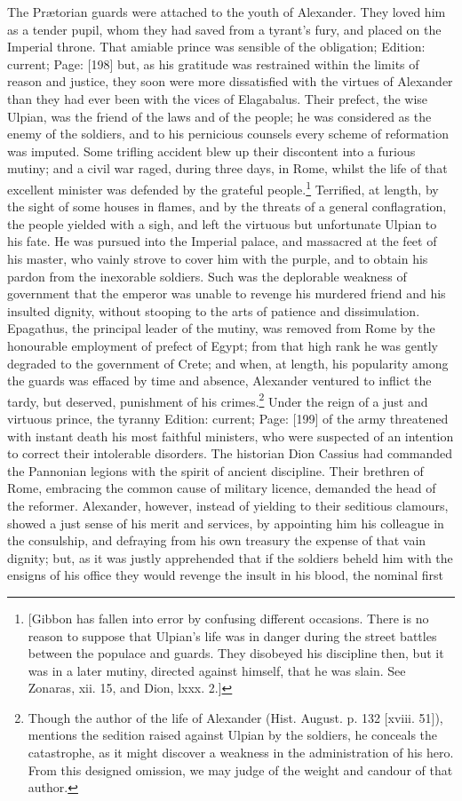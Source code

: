The Prætorian guards were attached to the youth of Alexander. They loved him as a tender pupil, whom they had saved from a tyrant\texthebrew{}’s fury, and placed on the Imperial throne. That amiable prince was sensible of the obligation; Edition: current; Page: [198] but, as his gratitude was restrained within the limits of reason and justice, they soon were more dissatisfied with the virtues of Alexander than they had ever been with the vices of Elagabalus. Their prefect, the wise Ulpian, was the friend of the laws and of the people; he was considered as the enemy of the soldiers, and to his pernicious counsels every scheme of reformation was imputed. Some trifling accident blew up their discontent into a furious mutiny; and a civil war raged, during three days, in Rome, whilst the life of that excellent minister was defended by the grateful people.\footnote{[Gibbon has fallen into error by confusing different occasions. There is no reason to suppose that Ulpian\texthebrew{}’s life was in danger during the street battles between the populace and guards. They disobeyed his discipline then, but it was in a later mutiny, directed against himself, that he was slain. See Zonaras, xii. 15, and Dion, lxxx. 2.]} Terrified, at length, by the sight of some houses in flames, and by the threats of a general conflagration, the people yielded with a sigh, and left the virtuous but unfortunate Ulpian to his fate. He was pursued into the Imperial palace, and massacred at the feet of his master, who vainly strove to cover him with the purple, and to obtain his pardon from the inexorable soldiers. Such was the deplorable weakness of government that the emperor was unable to revenge his murdered friend and his insulted dignity, without stooping to the arts of patience and dissimulation. Epagathus, the principal leader of the mutiny, was removed from Rome by the honourable employment of prefect of Egypt; from that high rank he was gently degraded to the government of Crete; and when, at length, his popularity among the guards was effaced by time and absence, Alexander ventured to inflict the tardy, but deserved, punishment of his crimes.\footnote{Though the author of the life of Alexander (Hist. August. p. 132 [xviii. 51]), mentions the sedition raised against Ulpian by the soldiers, he conceals the catastrophe, as it might discover a weakness in the administration of his hero. From this designed omission, we may judge of the weight and candour of that author.} Under the reign of a just and virtuous prince, the tyranny Edition: current; Page: [199] of the army threatened with instant death his most faithful ministers, who were suspected of an intention to correct their intolerable disorders. The historian Dion Cassius had commanded the Pannonian legions with the spirit of ancient discipline. Their brethren of Rome, embracing the common cause of military licence, demanded the head of the reformer. Alexander, however, instead of yielding to their seditious clamours, showed a just sense of his merit and services, by appointing him his colleague in the consulship, and defraying from his own treasury the expense of that vain dignity; but, as it was justly apprehended that if the soldiers beheld him with the ensigns of his office they would revenge the insult in his blood, the nominal first 